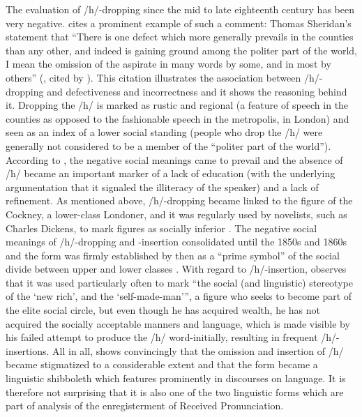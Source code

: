 The evaluation of /h/-dropping since the mid to late eighteenth century has been very negative. \citet[99]{Mugglestone2003} cites a prominent example of such a comment: Thomas Sheridan’s statement that “There is one defect which more generally prevails in the counties than any other, and indeed is gaining ground among the politer part of the world, I mean the omission of the aspirate in many words by some, and in most by others” (\citealt[34]{Sheridan1762}, cited by \citealt[99]{Mugglestone2003}). This citation illustrates the association between /h/\--dropping and defectiveness and incorrectness and it shows the reasoning behind it. Dropping the /h/ is marked as rustic and regional (a feature of speech in the counties as opposed to the fashionable speech in the metropolis, in London) and seen as an index of a lower social standing (people who drop the /h/ were generally not considered to be a member of the “politer part of the world”). According to \citet[115]{Mugglestone2003}, the negative social meanings came to prevail and the absence of /h/ became an important marker of a lack of education (with the underlying argumentation that it signaled the illiteracy of the speaker) and a lack of refinement. As mentioned above, /h/-dropping became linked to the figure of the Cockney, a lower-class Londoner, and it was regularly used by novelists, such as Charles Dickens, to mark figures as socially inferior \citep[122]{Mugglestone2003}. The negative social meanings of /h/-dropping and -insertion consolidated until the 1850s and 1860s and the form was firmly established by then as a “prime symbol” of the social divide between upper and lower classes \citep[113]{Mugglestone2003}. With regard to /h/-insertion, \citet[108]{Mugglestone2003} observes that it was used particularly often to mark “the social (and linguistic) stereotype of the ‘new rich’, and the ‘self-made-man’”, a figure who seeks to become part of the elite social circle, but even though he has acquired wealth, he has not acquired the socially acceptable manners and language, which is made visible by his failed attempt to produce the /h/ word-initially, resulting in frequent /h/\--insertions. All in all, \citet{Mugglestone2003} shows convincingly that the omission and insertion of /h/ became stigmatized to a considerable extent and that the form became a linguistic shibboleth which features prominently in discourses on language. It is therefore not surprising that it is also one of the two linguistic forms which are part of  analysis of the enregisterment of Received Pronunciation.


